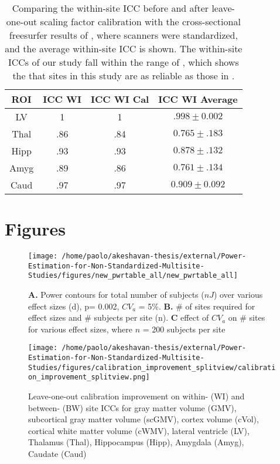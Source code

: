 \documentclass{article}
\begin{document}
\begin{table} 
    \begin{tabular}{ c c c c }
        ROI & ICC WI & ICC WI Cal & \cite{jovicich2013brain} ICC WI Average \\ 
        \midrule
        LV & 1 & 1 & $.998 \pm 0.002$ \\ 
        Thal & .86 & .84 & $0.765 \pm .183$ \\ 
        Hipp & .93 & .93 & $0.878 \pm .132$ \\ 
        Amyg & .89 & .86 & $0.761 \pm .134$ \\ 
        Caud & .97 & .97 & $0.909 \pm 0.092$ \\ 
        \bottomrule
    \end{tabular} 
    \caption{Comparing the within-site ICC before and after leave-one-out scaling factor calibration with the cross-sectional freesurfer results of \cite{jovicich2013brain}, where scanners were standardized, and the average within-site ICC is shown. The within-site ICCs of our study fall within the range of \cite{jovicich2013brain}, which shows the that sites in this study are as reliable as those in \cite{jovicich2013brain}.} 
    \label{comparetojov}
\end{table}
\clearpage
\section{Figures}

\begin{figure}[]
\begin{center}
\texttt{[image: /home/paolo/akeshavan-thesis/external/Power-Estimation-for-Non-Standardized-Multisite-Studies/figures/new\_pwrtable\_all/new\_pwrtable\_all]}
\caption{ \protect\label{fig:power} \textbf{A.} Power contours for total number of subjects ($nJ$) over various effect sizes (d), p= 0.002, $CV_a$ = 5\%. \textbf{B.} \# of sites required for effect sizes and \# subjects per site (n). \textbf{C} effect of $CV_a$ on \# sites for various effect sizes, where $n$ = 200 subjects per site}
\end{center}
\end{figure}


\begin{figure}[]
\begin{center}
\texttt{[image: /home/paolo/akeshavan-thesis/external/Power-Estimation-for-Non-Standardized-Multisite-Studies/figures/calibration\_improvement\_splitview/calibration\_improvement\_splitview.png]}
\caption{ \protect\label{fig:calib} Leave-one-out calibration improvement on within- (WI) and between- (BW) site ICCs for gray matter volume (GMV), subcortical gray matter volume (scGMV), cortex volume (cVol), cortical white matter volume (cWMV), lateral ventricle (LV), Thalamus (Thal), Hippocampus (Hipp), Amygdala (Amyg), Caudate (Caud)}
\end{center}
\end{figure}
\end{document}
